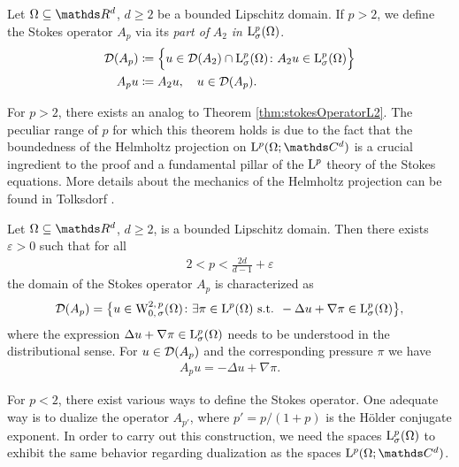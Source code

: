 \begin{defn}
  \label{defn:stokeslp}
  Let $\Omega\subseteq \R^d$, $d \geq 2$ be a bounded Lipschitz domain.
  If $p > 2$, we define the Stokes operator $A_p$ via its \emph{part of} $A_2$ \emph{in } $\mathrm{L}^p_\sigma(\Omega)$.
  \begin{align*}
    \mathcal{D}(A_p) &\coloneqq \Big\{ u \in \mathcal{D}(A_2) \cap \mathrm{L}^p_\sigma(\Omega) \colon A_2 u \in \mathrm{L}^p_\sigma(\Omega) \Big\} \\
    A_p u &\coloneqq A_2 u, \quad u \in \mathcal{D}(A_p).
  \end{align*}
\end{defn}

For $p > 2$, there exists an analog to Theorem \ref{thm:stokesOperatorL2}. The peculiar range of $p$ for which this theorem holds is due to the fact that the boundedness of the Helmholtz projection on $\Ell^p(\Omega; \C^d)$ is a crucial ingredient to the proof and a fundamental pillar of the $\mathrm{L}^p$ theory of the Stokes equations.
More details about the mechanics of the Helmholtz projection can be found in Tolksdorf \cite[Sec. 5.1]{tolksdorf}.

\begin{thm}
  \label{thm:domainStokesOperatorLp}
  Let $\Omega \subseteq \R^d$, $d \geq 2$, is a bounded Lipschitz domain.
  Then there exists $\varepsilon > 0$ such that for all
  \begin{align*}
    2 < p < \frac{2d}{d - 1} + \varepsilon
  \end{align*}
  the domain of the Stokes operator $A_p$ is characterized as
  \begin{align*}
    \mathcal{D}(A_p) = \big\{ u \in \mathrm{W}^{2,\,p}_{0,\,\sigma}(\Omega) \colon \exists \pi \in \mathrm{L}^p(\Omega) \text{ s.t. } -\Delta u + \nabla \pi \in \mathrm{L}^p_\sigma(\Omega) \big\},
  \end{align*}
  where the expression $\Delta u + \nabla \pi \in\mathrm{L}^p_\sigma(\Omega)$ needs to be understood in the distributional sense.
  For $u \in \mathcal{D}(A_p)$ and the corresponding pressure $\pi$ we have
  \begin{align*}
    A_p u = -\Delta u + \nabla \pi.
  \end{align*}
\end{thm}

For $p < 2$, there exist various ways to define the Stokes operator.
One adequate way is to dualize the operator $A_{p'}$, where $p' = p / (1 + p)$ is the Hölder conjugate exponent.
In order to carry out this construction, we need the spaces $\mathrm{L}^p_\sigma(\Omega)$ to exhibit the same behavior regarding dualization as the spaces $\Ell^p(\Omega; \C^d)$.

